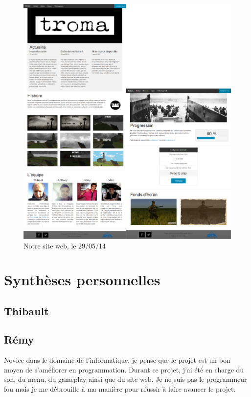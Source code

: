 \documentclass[11pt]{report}
\begin{document}
\begin{figure}[htbp]
\centering
\includegraphics[width=13cm]{site_web.png}
\caption{Notre site web, le 29/05/14}
\end{figure}

\chapter{Synthèses personnelles}

\section{Thibault}

\section{Rémy}

Novice dans le domaine de l'informatique, je pense que le projet est un bon moyen de s'améliorer en programmation. Durant ce projet, j'ai été en charge du son, du menu, du gameplay ainsi que du site web. Je ne suis pas le programmeur fou mais je me débrouille à ma manière pour réussir à faire avancer le projet.
\end{document}
